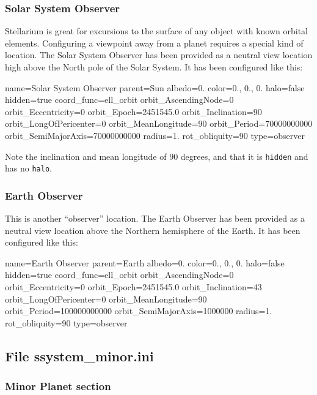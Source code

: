 \subsubsection{Solar System Observer}
\label{sec:ssystem.ini:SolarSystemObserver}

Stellarium is great for excursions to the surface of any object with
known orbital elements.  Configuring a viewpoint away from a planet
requires a special kind of location. The Solar System Observer has
been provided as a neutral view location high above the North pole of
the Solar System. It has been configured like this:
\begin{configfile}
name=Solar System Observer
parent=Sun
albedo=0.
color=0., 0., 0.
halo=false
hidden=true
coord_func=ell_orbit
orbit_AscendingNode=0
orbit_Eccentricity=0
orbit_Epoch=2451545.0
orbit_Inclination=90
orbit_LongOfPericenter=0
orbit_MeanLongitude=90
orbit_Period=70000000000
orbit_SemiMajorAxis=70000000000
radius=1.
rot_obliquity=90
type=observer
\end{configfile}
Note the inclination and mean longitude of 90 degrees, and that it is \texttt{hidden} and has no \texttt{halo}. 

\subsubsection{Earth Observer}
\label{sec:ssystem.ini:EarthObserver}

This is another ``observer'' location.  The Earth Observer has
been provided as a neutral view location above the Northern hemisphere of
the Earth. It has been configured like this:
\begin{configfile}
name=Earth Observer
parent=Earth
albedo=0.
color=0., 0., 0.
halo=false
hidden=true
coord_func=ell_orbit
orbit_AscendingNode=0
orbit_Eccentricity=0
orbit_Epoch=2451545.0
orbit_Inclination=43
orbit_LongOfPericenter=0
orbit_MeanLongitude=90
orbit_Period=100000000000
orbit_SemiMajorAxis=1000000
radius=1.
rot_obliquity=90
type=observer
\end{configfile}


\subsection{File ssystem\_minor.ini}
\label{sec:ssystem.ini:minor}

\subsubsection{Minor Planet section}
\label{sec:ssystem.ini:MinorPlanet}

